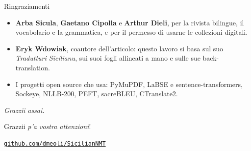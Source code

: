 \documentclass[aspectratio=169]{beamer}
\newcommand{\T}[2]{#2}
\newcommand{\T}[2]{#1}
\begin{document}
\begin{frame}{\T{Acknowledgements}{Ringraziamenti}}
  \begin{itemize}
    \item \T{\textbf{Arba Sicula}, \textbf{Gaetano Cipolla} and \textbf{Arthur Dieli}, for the
          bilingual journal, the vocabulary and the grammar, and for the permission to use
          their digital collections.}%
          {\textbf{Arba Sicula}, \textbf{Gaetano Cipolla} e \textbf{Arthur Dieli}, per la
          rivista bilingue, il vocabolario e la grammatica, e per il permesso di usarne le
          collezioni digitali.}
    \item \T{\textbf{Eryk Wdowiak}, co-author of the paper, whose \emph{Tradutturi Sicilianu},
          hand-aligned sheets and back-translations this work builds on.}%
          {\textbf{Eryk Wdowiak}, coautore dell'articolo: questo lavoro si basa sul suo \emph{Tradutturi Sicilianu}, sui suoi fogli allineati a mano e sulle sue back-translation.}
    \item \T{The open-source projects it stands on: PyMuPDF, LaBSE and sentence-transformers,
          Sockeye, NLLB-200, PEFT, sacreBLEU, CTranslate2.}%
          {I progetti open source che usa: PyMuPDF, LaBSE e sentence-transformers,
          Sockeye, NLLB-200, PEFT, sacreBLEU, CTranslate2.}
  \end{itemize}
  \vfill
  {\footnotesize\color{gray} \textit{Grazzii assai.}}
\end{frame}

\begin{frame}[standout]
  Grazzii \emph{p'a vostra attenzioni}!
  \par{}
  {\mdseries\hypersetup{urlcolor=lamalunga-on-primary}%
   \href{https://github.com/dmeoli/SicilianNMT}{\texttt{github.com/dmeoli/SicilianNMT}}}
\end{frame}
\end{document}

